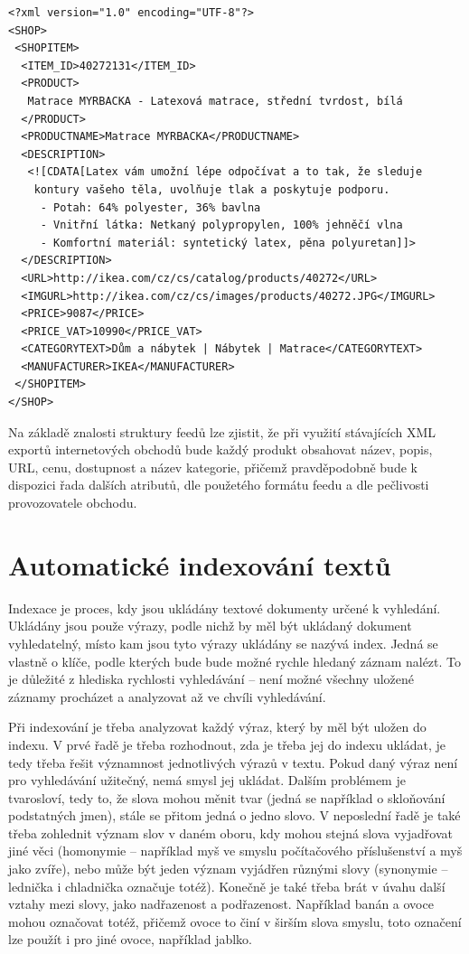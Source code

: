 \documentclass[FM,DP]{tulthesis}
\newenvironment{code}
    {\filbreak\captionsetup{type=listing}}{\filbreak}
\begin{document}
\begin{code}
\captionsetup{singlelinecheck=false,justification=raggedright}
\label{code:xml-heureka}
\begin{verbatim}
<?xml version="1.0" encoding="UTF-8"?>
<SHOP>
 <SHOPITEM>
  <ITEM_ID>40272131</ITEM_ID>
  <PRODUCT>
   Matrace MYRBACKA - Latexová matrace, střední tvrdost, bílá
  </PRODUCT>
  <PRODUCTNAME>Matrace MYRBACKA</PRODUCTNAME>
  <DESCRIPTION>
   <![CDATA[Latex vám umožní lépe odpočívat a to tak, že sleduje
    kontury vašeho těla, uvolňuje tlak a poskytuje podporu.
     - Potah: 64% polyester, 36% bavlna
     - Vnitřní látka: Netkaný polypropylen, 100% jehněčí vlna
     - Komfortní materiál: syntetický latex, pěna polyuretan]]>
  </DESCRIPTION>
  <URL>http://ikea.com/cz/cs/catalog/products/40272</URL>
  <IMGURL>http://ikea.com/cz/cs/images/products/40272.JPG</IMGURL>
  <PRICE>9087</PRICE>
  <PRICE_VAT>10990</PRICE_VAT>
  <CATEGORYTEXT>Dům a nábytek | Nábytek | Matrace</CATEGORYTEXT>
  <MANUFACTURER>IKEA</MANUFACTURER>
 </SHOPITEM>
</SHOP>
\end{verbatim}
\end{code}

Na základě znalosti struktury feedů lze zjistit, že při využití stávajících XML exportů
internetových obchodů bude každý produkt obsahovat název, popis, URL, cenu, dostupnost
a název kategorie, přičemž pravděpodobně bude k dispozici řada dalších atributů, 
dle použetého formátu feedu a dle pečlivosti provozovatele obchodu.

\section{Automatické indexování textů}

Indexace je proces, kdy jsou ukládány textové dokumenty určené k vyhledání.
Ukládány jsou použe výrazy, podle nichž by měl být ukládaný dokument vyhledatelný, 
místo kam jsou tyto výrazy ukládány se nazývá index. Jedná se vlastně o klíče, 
podle kterých bude bude možné rychle hledaný záznam nalézt. To je důležité z hlediska
rychlosti vyhledávání -- není možné všechny uložené záznamy procházet a analyzovat
až ve chvíli vyhledávání. 

Při indexování je třeba analyzovat každý výraz, který by měl být uložen do indexu.
V prvé řadě je třeba rozhodnout, zda je třeba jej do indexu ukládat, je tedy 
třeba řešit významnost jednotlivých výrazů v textu. Pokud daný
výraz není pro vyhledávání užitečný, nemá smysl jej ukládat. Dalším problémem je 
tvarosloví, tedy to, že slova mohou měnit tvar (jedná se například o skloňování 
podstatných jmen), stále se přitom jedná o jedno slovo. V neposlední řadě je také 
třeba zohlednit význam slov v daném oboru, kdy mohou stejná slova vyjadřovat jiné věci 
(homonymie -- například myš ve smyslu počítačového příslušenství a myš jako zvíře), 
nebo může být jeden význam vyjádřen různými slovy (synonymie -- lednička i chladnička 
označuje totéž). Konečně je také třeba brát v úvahu další vztahy mezi slovy, 
jako nadřazenost a podřazenost. Například banán a ovoce mohou označovat totéž, 
přičemž ovoce to činí v širším slova smyslu, toto označení lze použít i pro jiné 
ovoce, například jablko.
\end{document}
